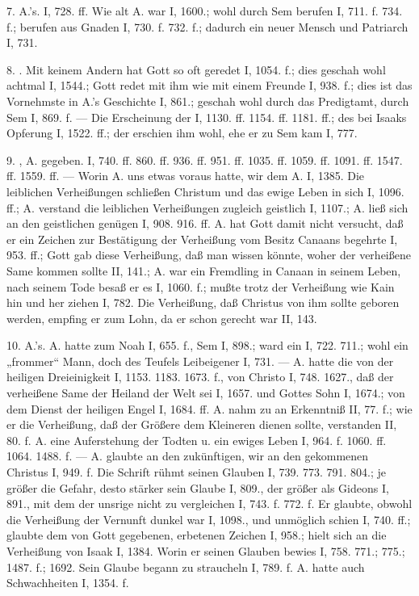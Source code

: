 7.  A.’s. I, 728. ff. Wie alt A. war I, 1600.; wohl durch Sem berufen I, 711. f. 734. f.; berufen aus Gnaden I, 730. f. 732. f.; dadurch ein neuer Mensch und Patriarch I, 731.

8. . Mit keinem Andern hat Gott so oft geredet I, 1054. f.; dies geschah wohl achtmal I, 1544.; Gott redet mit ihm wie mit einem Freunde I, 938. f.; dies ist das Vornehmste in A.’s Geschichte I, 861.; geschah wohl durch das Predigtamt, durch Sem I, 869. f. — Die Erscheinung der  I, 1130. ff. 1154. ff. 1181. ff.; des  bei Isaaks Opferung I, 1522. ff.; der  erschien ihm wohl, ehe er zu Sem kam I, 777.

9. , A. gegeben. I, 740. ff. 860. ff. 936. ff. 951. ff. 1035. ff. 1059. ff. 1091. ff. 1547. ff. 1559. ff. — Worin A. uns etwas voraus hatte, wir dem A. I, 1385. Die leiblichen Verheißungen schließen Christum und das ewige Leben in sich I, 1096. ff.; A. verstand die leiblichen Verheißungen zugleich geistlich I, 1107.; A. ließ sich an den geistlichen genügen I, 908. 916. ff. A. hat Gott damit nicht versucht, daß er ein Zeichen zur Bestätigung der Verheißung vom Besitz Canaans begehrte I, 953. ff.; Gott gab diese Verheißung, daß man wissen könnte, woher der verheißene Same kommen sollte II, 141.; A. war ein Fremdling in Canaan in seinem Leben, nach seinem Tode besaß er es I, 1060. f.; mußte trotz der Verheißung wie Kain hin und her ziehen I, 782. Die Verheißung, daß Christus von ihm sollte geboren werden, empfing er zum Lohn, da er schon gerecht war II, 143.

10.  A.’s. A. hatte zum  Noah I, 655. f., Sem I, 898.; ward ein  I, 722. 711.; wohl ein „frommer“ Mann, doch des Teufels Leibeigener I, 731. — A. hatte die  von der heiligen Dreieinigkeit I, 1153. 1183. 1673. f., von Christo I, 748. 1627., daß der verheißene Same der Heiland der Welt sei I, 1657. und Gottes Sohn I, 1674.; von dem Dienst der heiligen Engel I, 1684. ff. A. nahm zu an Erkenntniß II, 77. f.; wie er die Verheißung, daß der Größere dem Kleineren dienen sollte, verstanden II, 80. f. A.  eine Auferstehung der Todten u. ein ewiges Leben I, 964. f. 1060. ff. 1064. 1488. f. — A. glaubte an den zukünftigen, wir an den gekommenen Christus I, 949. f. Die Schrift rühmt seinen Glauben I, 739. 773. 791. 804.; je größer die Gefahr, desto stärker sein Glaube I, 809., der größer als Gideons I, 891., mit dem der unsrige nicht zu vergleichen I, 743. f. 772. f. Er glaubte, obwohl die Verheißung der Vernunft dunkel war I, 1098., und unmöglich schien I, 740. ff.; glaubte dem von Gott gegebenen, erbetenen Zeichen I, 958.; hielt sich an die Verheißung von Isaak I, 1384. Worin er seinen Glauben bewies I, 758. 771.; 775.; 1487. f.; 1692. Sein Glaube begann zu straucheln I, 789. f. A. hatte auch Schwachheiten I, 1354. f.

